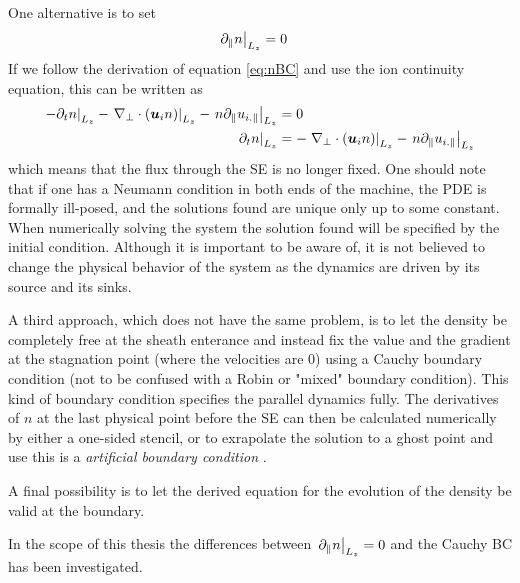 One alternative is to set
%
\begin{align*}
    \left. \partial_\| n \right|_{L_z} &= 0
\end{align*}
%
If we follow the derivation of equation \ref{eq:nBC} and use the ion continuity
equation, this can be written as
%
\begin{align*}
    \left.- \partial_tn \right|_{L_z}- \left.\nabla_\perp\cdot\left(\boldsymbol{u}_{i} n \right)\right|_{L_z}
    -\left.n \partial_\| u_{i.\|}\right|_{L_z}
    &= 0\\
    \left.\partial_tn \right|_{L_z}&=  - \left.\nabla_\perp\cdot\left(\boldsymbol{u}_{i} n \right)\right|_{L_z}-
    \left.n \partial_\| u_{i.\|}\right|_{L_z}
\end{align*}
%
which means that the flux through the SE is no longer fixed. One should note
that if one has a Neumann condition in both ends of the machine, the PDE is
formally ill-posed, and the solutions found are unique only up to some
constant. When numerically solving the system the solution found will be
specified by the initial condition. Although it is important to be aware of, it
is not believed to change the physical behavior of the system as the dynamics
are driven by its source and its sinks.

A third approach, which does not have the same problem, is to let the density
be completely free at the sheath enterance and instead fix the value and the
gradient at the stagnation point (where the velocities are $0$) using a Cauchy
boundary condition (not to be confused with a Robin or "mixed" boundary
condition). This kind of boundary condition specifies the parallel dynamics
fully. The derivatives of $n$ at the last physical point before the SE can then
be calculated numerically by either a one-sided stencil, or to exrapolate the
solution to a ghost point and use this is a \emph{artificial boundary
condition} \cite{Leveque2007book}.

A final possibility is to let the derived equation for the evolution of the
density be valid at the boundary.

In the scope of this thesis the differences between $\left. \partial_\| n \right|_{L_z} = 0$
and the Cauchy BC has been investigated.


